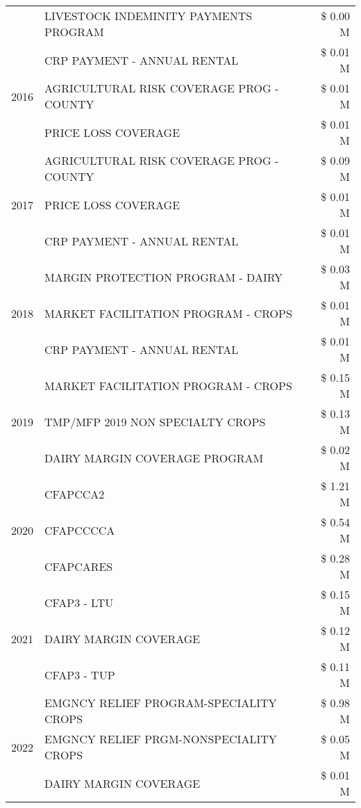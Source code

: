 \begin{tabular}{llr}
 & LIVESTOCK INDEMINITY PAYMENTS PROGRAM & \$ 0.00 M \\
\cline{1-3}
\multirow[t]{3}{*}{2016} & CRP PAYMENT - ANNUAL RENTAL & \$ 0.01 M \\
 & AGRICULTURAL RISK COVERAGE PROG - COUNTY & \$ 0.01 M \\
 & PRICE LOSS COVERAGE & \$ 0.01 M \\
\cline{1-3}
\multirow[t]{3}{*}{2017} & AGRICULTURAL RISK COVERAGE PROG - COUNTY & \$ 0.09 M \\
 & PRICE LOSS COVERAGE & \$ 0.01 M \\
 & CRP PAYMENT - ANNUAL RENTAL & \$ 0.01 M \\
\cline{1-3}
\multirow[t]{3}{*}{2018} & MARGIN PROTECTION PROGRAM - DAIRY & \$ 0.03 M \\
 & MARKET FACILITATION PROGRAM - CROPS & \$ 0.01 M \\
 & CRP PAYMENT - ANNUAL RENTAL & \$ 0.01 M \\
\cline{1-3}
\multirow[t]{3}{*}{2019} & MARKET FACILITATION PROGRAM - CROPS & \$ 0.15 M \\
 & TMP/MFP 2019 NON SPECIALTY CROPS & \$ 0.13 M \\
 & DAIRY MARGIN COVERAGE PROGRAM & \$ 0.02 M \\
\cline{1-3}
\multirow[t]{3}{*}{2020} & CFAPCCA2 & \$ 1.21 M \\
 & CFAPCCCCA & \$ 0.54 M \\
 & CFAPCARES & \$ 0.28 M \\
\cline{1-3}
\multirow[t]{3}{*}{2021} & CFAP3 - LTU & \$ 0.15 M \\
 & DAIRY MARGIN COVERAGE & \$ 0.12 M \\
 & CFAP3 - TUP & \$ 0.11 M \\
\cline{1-3}
\multirow[t]{3}{*}{2022} & EMGNCY RELIEF PROGRAM-SPECIALITY CROPS & \$ 0.98 M \\
 & EMGNCY RELIEF PRGM-NONSPECIALITY CROPS & \$ 0.05 M \\
 & DAIRY MARGIN COVERAGE & \$ 0.01 M \\
\cline{1-3}
\bottomrule
\end{tabular}
